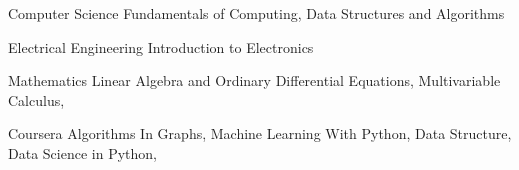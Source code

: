 


\begin{cvskills}


  \cvskill
  {Computer Science}
  {Fundamentals of Computing, Data Structures and Algorithms}


  \cvskill
  {Electrical Engineering}
  {Introduction to Electronics}

  
  \cvskill
  {Mathematics}
  {Linear Algebra and Ordinary Differential Equations, Multivariable Calculus,}
  
  \cvskill
  {Coursera}
  {Algorithms In Graphs, Machine Learning With Python, Data Structure, Data Science in Python,}

\end{cvskills}

